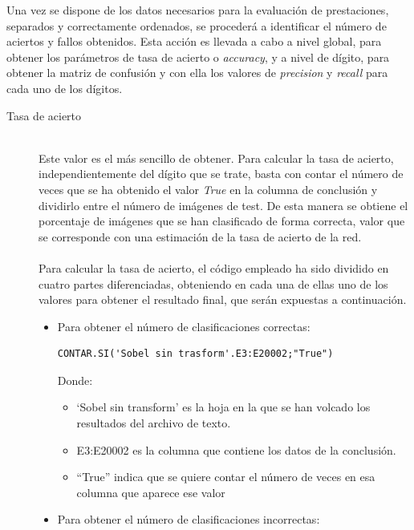 Una vez se dispone de los datos necesarios para la evaluación de prestaciones, separados y correctamente ordenados, se procederá a identificar el número de aciertos y fallos obtenidos. Esta acción es llevada a cabo a nivel global, para obtener los parámetros de tasa de acierto o \textit{accuracy}, y a nivel de dígito, para obtener la matriz de confusión y con ella los valores de \textit{precision} y \textit{recall} para cada uno de los dígitos.

\begin{description}
	\item[Tasa de acierto] \hfill 
	\vspace{5pt}
	\\
	Este valor es el más sencillo de obtener. Para calcular la tasa de acierto, independientemente del dígito que se trate, basta con contar el número de veces que se ha obtenido el valor \textit{True} en la columna de conclusión y dividirlo entre el número de imágenes de test. De esta manera se obtiene el porcentaje de imágenes que se han clasificado de forma correcta, valor que se corresponde con una estimación de la tasa de acierto de la red.\\
	\vspace{-10pt}
	\\
	Para calcular la tasa de acierto, el código empleado ha sido dividido en cuatro partes diferenciadas, obteniendo en cada una de ellas uno de los valores para obtener el resultado final, que serán expuestas a continuación.\\
	\vspace{10pt}
	\begin{itemize}
		\item{Para obtener el número de clasificaciones correctas:
		\vspace{10pt}
		\begin{lstlisting}[frame=single]
	CONTAR.SI('Sobel sin trasform'.E3:E20002;"True")
		\end{lstlisting}
		Donde:
		\begin{itemize}
			\item `Sobel sin transform' es la hoja en la que se han volcado los resultados del archivo de texto.
			\item E3:E20002 es la columna que contiene los datos de la conclusión.
			\item ``True'' indica que se quiere contar el número de veces en esa columna que aparece ese valor
		\end{itemize}
	}
	\item{Para obtener el número de clasificaciones incorrectas:
}
\end{itemize}
\end{description}
